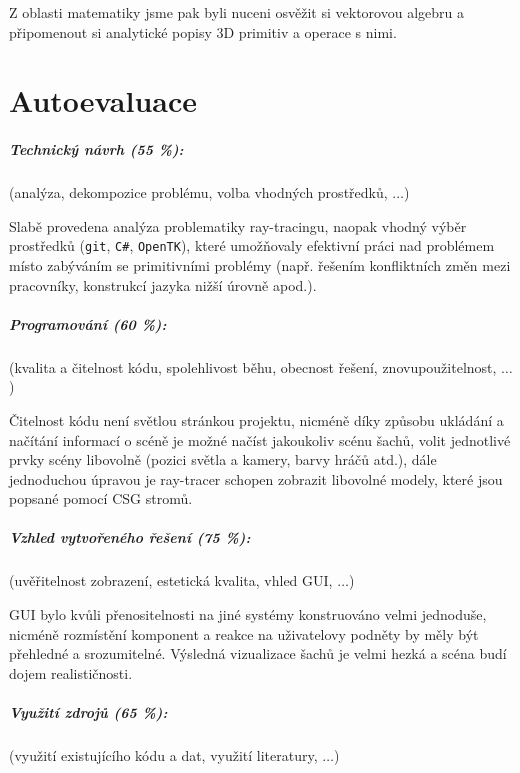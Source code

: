 \documentclass[12pt,a4paper,titlepage,final]{report}
\begin{document}
Z oblasti matematiky jsme pak byli nuceni osvěžit si vektorovou algebru a připomenout si analytické popisy 3D primitiv a operace s nimi.

\chapter{Autoevaluace}

\paragraph{Technický návrh (55 \%):} (analýza, dekompozice problému, volba
vhodných prostředků, $\ldots$) 

Slabě provedena analýza problematiky ray-tracingu, naopak vhodný výběr prostředků (\texttt{git}, \texttt{C\#}, \texttt{OpenTK}), které umožňovaly efektivní práci nad problémem místo zabýváním se primitivními problémy (např. řešením konfliktních změn mezi pracovníky, konstrukcí jazyka nižší úrovně apod.).

\paragraph{Programování (60 \%):} (kvalita a čitelnost kódu, spolehlivost běhu,
obecnost řešení, znovupoužitelnost, $\ldots$)

Čitelnost kódu není světlou stránkou projektu, nicméně díky způsobu ukládání a načítání informací o scéně je možné načíst jakoukoliv scénu šachů, volit jednotlivé prvky scény libovolně (pozici světla a kamery, barvy hráčů atd.), dále jednoduchou úpravou je ray-tracer schopen zobrazit libovolné modely, které jsou popsané pomocí CSG stromů. 


\paragraph{Vzhled vytvořeného řešení (75 \%):} (uvěřitelnost zobrazení,
estetická kvalita, vhled GUI, $\ldots$)

GUI bylo kvůli přenositelnosti na jiné systémy konstruováno velmi jednoduše, nicméně rozmístění komponent a reakce na uživatelovy podněty by měly být přehledné a srozumitelné. Výsledná vizualizace šachů je velmi hezká a scéna budí dojem realističnosti. 

\paragraph{Využití zdrojů (65 \%):} (využití existujícího kódu a dat, využití
literatury, $\ldots$)
\end{document}
